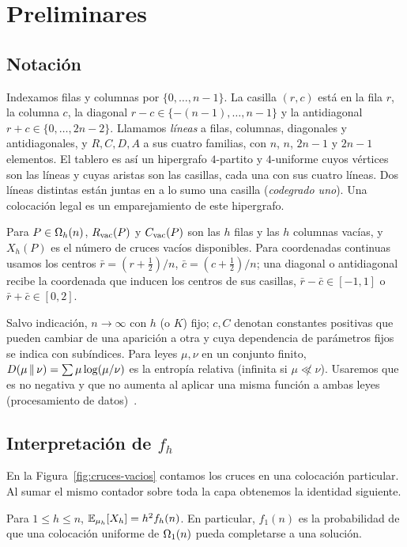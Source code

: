 \section{Preliminares}\label{sec:preliminares}

\subsection{Notación}

Indexamos filas y columnas por $\{0,\dots,n-1\}$. La casilla $(r,c)$ está en la fila $r$, la
columna $c$, la diagonal $r-c\in\{-(n-1),\dots,n-1\}$ y la antidiagonal
$r+c\in\{0,\dots,2n-2\}$. Llamamos \emph{líneas} a filas, columnas, diagonales y antidiagonales,
y $R,C,D,A$ a sus cuatro familias, con $n$, $n$, $2n-1$ y $2n-1$ elementos. El tablero es así un
hipergrafo $4$-partito y $4$-uniforme cuyos vértices son las líneas y cuyas aristas son las
casillas, cada una con sus cuatro líneas. Dos líneas distintas están juntas en a lo sumo una
casilla (\emph{codegrado uno}). Una colocación legal es un emparejamiento de este hipergrafo.

Para $P\in\Omega_h(n)$, $R_{\mathrm{vac}}(P)$ y $C_{\mathrm{vac}}(P)$ son las $h$ filas y las $h$ columnas vacías, y
$X_h(P)$ es el número de cruces vacíos disponibles. Para coordenadas continuas usamos los centros
$\bar r=(r+\frac12)/n$, $\bar c=(c+\frac12)/n$; una diagonal o antidiagonal recibe la coordenada
que inducen los centros de sus casillas, $\bar r-\bar c\in[-1,1]$ o $\bar r+\bar c\in[0,2]$.

Salvo indicación, $n\to\infty$ con $h$ (o $K$) fijo; $c,C$ denotan constantes positivas que
pueden cambiar de una aparición a otra y cuya dependencia de parámetros fijos se indica con
subíndices. Para leyes $\mu,\nu$ en un conjunto finito,
$D(\mu\,\Vert\,\nu)=\sum\mu\log(\mu/\nu)$ es la entropía relativa (infinita si
$\mu\not\ll\nu$). Usaremos que es no negativa y que no aumenta al aplicar una misma función a
ambas leyes (procesamiento de datos)~\cite{CoverThomas}.

\subsection{Interpretación de \texorpdfstring{$f_h$}{fh}}

En la Figura~\ref{fig:cruces-vacios} contamos los cruces en una colocación
particular. Al sumar el mismo contador sobre toda la capa obtenemos la
identidad siguiente.

\begin{lema}\label{lem:interpretacion}
Para $1\le h\le n$, $\mathbb{E}_{\mu_h}[X_h]=h^2f_h(n)$. En particular, $f_1(n)$ es la probabilidad de
que una colocación uniforme de $\Omega_1(n)$ pueda completarse a una solución.
\end{lema}

